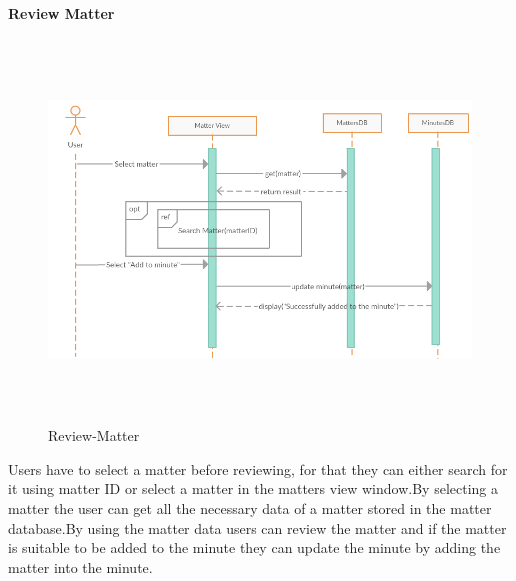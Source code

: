 \documentclass[a4paper,beamer]{article}
\begin{document}
		\textbf{Review Matter}\newline
		\begin{figure}[h!]
			\begin{center}
			\includegraphics[width=6in,height=4in]{img/seq-review-matter}
			\end{center}
			\caption{Review-Matter}
			\label{fig:review-matter}
		\end{figure}
		        
		Users have to select a matter before reviewing, for that they can either search for it using matter ID or select a matter in the matters view window.By selecting a matter the user can get all the necessary data of a matter stored in the matter database.By using the matter data users can review the matter and if the matter is suitable to be added to the minute they can update the minute by adding the matter into the minute.
		
		\newpage
	
\end{document}
